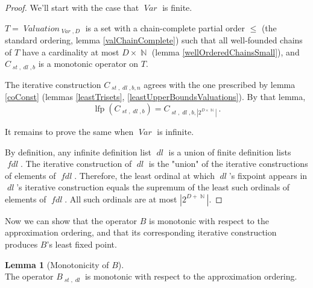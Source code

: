 \documentclass[oneside,12pt]{book}
\theoremstyle{definition}
\newtheorem{lemma}[theorem]{Lemma}
\theoremstyle{remark}
\newcommand\var[1]{\mathop{\mathit{#1}}\nolimits}
\newcommand{\st}{\var{st}}
\newcommand{\Var}{\var{Var}}
\DeclareMathOperator{\lfp}{lfp}
\newcommand{\Valuation}{\var{Valuation}}
\newcommand{\dl}{\var{dl}}
\newcommand{\Nat}{\var{\mathbb{N}}}
\begin{document}
\begin{proof}
  We'll start with the case that $\Var$ is finite.
  
  $T = \Valuation_{\Var,D}$ is a set with a chain-complete partial order $\leq$
  (the standard ordering, lemma \ref{valChainComplete}) such that all well-founded
  chains of $T$ have a cardinality at most $D \times \Nat$
  (lemma \ref{wellOrderedChainsSmall}), and $C_{\st,\dl,b}$ is a monotonic
  operator on $T$.
  
  The iterative construction $C_{\st,\dl,b,n}$ agrees with the one prescribed by
  lemma \ref{coConst} (lemmas \ref{leastTrisets}, \ref{leastUpperBoundsValuations}).
  By that lemma,
  \[\lfp(C_{\st,\dl,b}) = C_{\st,\dl,b,|2^{D \times \Nat}|}\,.\]
  
  It remains to prove the same when $\Var$ is infinite.
  
  By definition, any infinite definition list $\dl$ is a union of finite definition
  lists $\var{fdl}$. The iterative construction of $\dl$ is the "union"\footnotemark
  of the iterative constructions of elements of $\var{fdl}$. Therefore,
  the least ordinal at which $\dl$'s fixpoint appears in $\dl$'s iterative
  construction equals the supremum of the least such ordinals of elements
  of $\var{fdl}$. All such ordinals are at most $|2^{D+\Nat}|$.
  
\end{proof}

Now we can show that the operator $B$ is monotonic with respect to the approximation
ordering, and that its corresponding iterative construction produces $B$'s least
fixed point.

\begin{lemma}[Monotonicity of $B$] \hfill \\
  The operator $B_{\st,\dl}$ is monotonic with respect to the approximation ordering.
\end{lemma}
\end{document}
